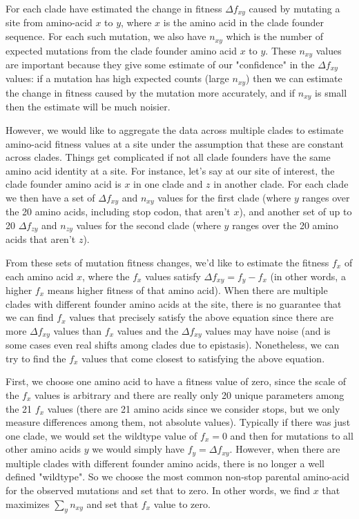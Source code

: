 \documentclass[9pt,twocolumn,twoside]{gsajnl_modified}
\begin{document}
{For each clade have estimated the change in fitness $\Delta f_{xy}$ caused by mutating a site from amino-acid $x$ to $y$, where $x$ is the amino acid in the clade founder sequence.
For each such mutation, we also have $n_{xy}$ which is the number of expected mutations from the clade founder amino acid $x$ to $y$.
These $n_{xy}$ values are important because they give some estimate of our "confidence" in the $\Delta f_{xy}$ values: if a mutation has high expected counts (large $n_{xy}$) then we can estimate the change in fitness caused by the mutation more accurately, and if $n_{xy}$ is small then the estimate will be much noisier.

However, we would like to aggregate the data across multiple clades to estimate amino-acid fitness values at a site under the assumption that these are constant across clades.
Things get complicated if not all clade founders have the same amino acid identity at a site.
For instance, let's say at our site of interest, the clade founder amino acid is $x$ in one clade and $z$ in another clade.
For each clade we then have a set of $\Delta f_{xy}$ and $n_{xy}$ values for the first clade (where $y$ ranges over the 20 amino acids, including stop codon, that aren't $x$), and another set of up to 20 $\Delta f_{zy}$ and $n_{zy}$ values for the second clade (where $y$ ranges over the 20 amino acids that aren't $z$).

From these sets of mutation fitness changes, we'd like to estimate the fitness $f_x$ of each amino acid $x$, where the $f_x$ values satisfy $\Delta f_{xy} = f_y - f_x$ (in other words, a higher $f_x$ means higher fitness of that amino acid).
When there are multiple clades with different founder amino acids at the site, there is no guarantee that we can find $f_x$ values that precisely satisfy the above equation since there are more $\Delta f_{xy}$ values than $f_x$ values and the $\Delta f_{xy}$ values may have noise (and is some cases even real shifts among clades due to epistasis).
Nonetheless, we can try to find the $f_x$ values that come closest to satisfying the above equation.

First, we choose one amino acid to have a fitness value of zero, since the scale of the $f_x$ values is arbitrary and there are really only 20 unique parameters among the 21 $f_x$ values (there are 21 amino acids since we consider stops, but we only measure differences among them, not absolute values).
Typically if there was just one clade, we would set the wildtype value of $f_x = 0$ and then for mutations to all other amino acids $y$ we would simply have $f_y = \Delta f_{xy}$.
However, when there are multiple clades with different founder amino acids, there is no longer a well defined "wildtype".
So we choose the most common non-stop parental amino-acid for the observed mutations and set that to zero.
In other words, we find $x$ that maximizes $\sum_y n_{xy}$ and set that $f_x$ value to zero.

}
\end{document}
